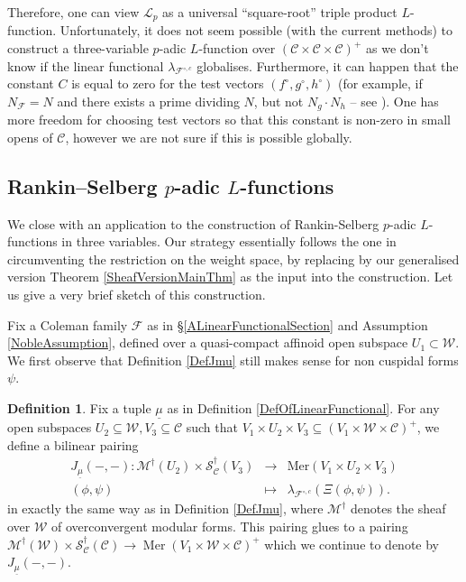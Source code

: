 \documentclass[10pt, oneside]{amsart}
\numberwithin{equation}{subsection}
\theoremstyle{definition}
\newtheorem{definition}[equation]{Definition}
\theoremstyle{remark}
\newcommand{\opn}[1]{\operatorname{#1}}
\begin{document}
Therefore, one can view $\mathscr{L}_p$ as a universal ``square-root'' triple product $L$-function. Unfortunately, it does not seem possible (with the current methods) to construct a three-variable $p$-adic $L$-function over $(\mathcal{C} \times \mathcal{C} \times \mathcal{C})^+$ as we don't know if the linear functional $\lambda_{\mathcal{F}^{\circ, c}}$ globalises. Furthermore, it can happen that the constant $C$ is equal to zero for the test vectors $(f^{\circ}, g^{\circ}, h^{\circ})$ (for example, if $N_{\mathcal{F}} = N$ and there exists a prime dividing $N$, but not $N_g \cdot N_h$ -- see \cite[Remark 4.3]{DarmonRotgerGrossZagier1}). One has more freedom for choosing test vectors so that this constant is non-zero in small opens of $\mathcal{C}$, however we are not sure if this is possible globally. 

\subsection{Rankin--Selberg \texorpdfstring{$p$}{p}-adic \texorpdfstring{$L$}{L}-functions}

We close with an application to the construction of Rankin-Selberg $p$-adic $L$-functions in three variables. Our strategy essentially follows the one in \cite[Appendix B]{AI_LLL} circumventing the restriction on the weight space, by replacing \cite[Theorem 4.3]{AI_LLL} by our generalised version Theorem \ref{SheafVersionMainThm} as the input into the construction. Let us give a very brief sketch of this construction.

Fix a Coleman family $\mathcal{F}$ as in \S \ref{ALinearFunctionalSection} and Assumption \ref{NobleAssumption}, defined over a quasi-compact affinoid open subspace $U_1 \subset \mathcal{W}$. We first observe that Definition \ref{DefJmu} still makes sense for non cuspidal forms $\psi$.

\begin{definition}
Fix a tuple $\underline{\mu}$ as in Definition \ref{DefOfLinearFunctional}. For any open subspaces $U_2 \subseteq \mathcal{W}, V_3 \subseteq \mathcal{C}$ such that $V_1 \times U_2 \times V_3 \subseteq (V_1 \times \mathcal{W} \times \mathcal{C})^+$, we define a bilinear pairing
\begin{eqnarray*}
J_{\underline{\mu}}(-,-): \mathcal{M}^\dagger(U_2) \times \mathcal{S}^\dagger_\mathcal{C}(V_3) &\to& \mathrm{Mer}(V_1 \times U_2 \times V_3) \\
(\phi, \psi) &\mapsto& \lambda_{\mathcal{F}^{\circ, c}}(\Xi(\phi, \psi)).
\end{eqnarray*}
in exactly the same way as in Definition \ref{DefJmu}, where $\mathcal{M}^{\dagger}$ denotes the sheaf over $\mathcal{W}$ of overconvergent modular forms. This pairing glues to a pairing $\mathcal{M}^{\dagger}(\mathcal{W}) \times \mathcal{S}_{\mathcal{C}}^{\dagger}(\mathcal{C}) \to \opn{Mer}(V_1 \times \mathcal{W} \times \mathcal{C})^+$ which we continue to denote by $J_{\underline{\mu}}(-,-)$.
\end{definition}
\end{document}
